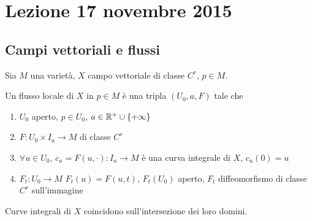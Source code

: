 \chapter{Lezione 17 novembre 2015}

\section{Campi vettoriali e flussi}


Sia $M$ una varietà, $X$ campo vettoriale di classe $C^r$, $p\in M$.
\begin{definition}\label{def:flussolocale}
	Un flusso locale di $X$ in $p \in M$ è una tripla $(U_0, a, F)$ tale che
	\begin{enumerate}
		\item $U_0$ aperto, $p\in U_0$, $a \in \mathbb R^+ \cup \{+\infty\}$ \label{FL:aperto}
		\item $F:U_0\times I_a \to M$ di classe $C^r$ \label{FL:Cr}
		\item $\forall u\in U_0$, $c_u=F(u,\cdot):I_a\to M$ è una curva integrale di $X$, $c_u(0)=u$ \label{FL:curvaintegrale}
		\item $F_t:U_0\to M$ $F_t(u)=F(u,t)$, $F_t(U_0)$ aperto, $F_t$ diffeomorfismo di classe $C^r$ sull'immagine \label{FL:diffeo}
	\end{enumerate}
\end{definition}

\begin{proposition} \label{prop:unica}
	Curve integrali di $X$ coincidono sull'intersezione dei loro domini.
\end{proposition}

